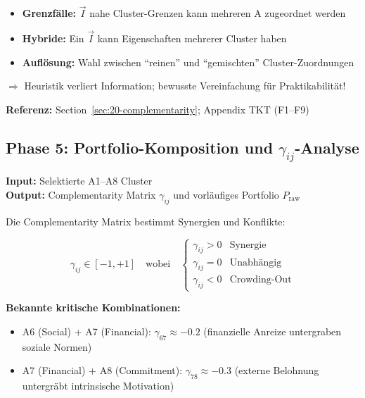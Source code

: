 \begin{tcolorbox}[colback=orange!5!white, colframe=orange!75!black,
    title=\textbf{Variabilität in Phase 4}]
\begin{itemize}[nosep]
\item \textbf{Grenzfälle:} $\vec{I}$ nahe Cluster-Grenzen kann mehreren A zugeordnet werden
\item \textbf{Hybride:} Ein $\vec{I}$ kann Eigenschaften mehrerer Cluster haben
\item \textbf{Auflösung:} Wahl zwischen ``reinen'' und ``gemischten'' Cluster-Zuordnungen
\end{itemize}
$\Rightarrow$ Heuristik verliert Information; bewusste Vereinfachung für Praktikabilität!
\end{tcolorbox}

\textbf{Referenz:} Section~\ref{sec:20-complementarity}; Appendix TKT (F1--F9)

\subsection{Phase 5: Portfolio-Komposition und $\gamma_{ij}$-Analyse}
\label{sec:20-phase5}

\textbf{Input:} Selektierte A1--A8 Cluster\\
\textbf{Output:} Complementarity Matrix $\gamma_{ij}$ und vorläufiges Portfolio $P_{\text{raw}}$

Die Complementarity Matrix bestimmt Synergien und Konflikte:

\begin{equation}
\gamma_{ij} \in [-1, +1] \quad \text{wobei} \quad
\begin{cases}
\gamma_{ij} > 0 & \text{Synergie} \\
\gamma_{ij} = 0 & \text{Unabhängig} \\
\gamma_{ij} < 0 & \text{Crowding-Out}
\end{cases}
\end{equation}

\textbf{Bekannte kritische Kombinationen:}
\begin{itemize}[nosep]
\item A6 (Social) + A7 (Financial): $\gamma_{67} \approx -0.2$ (finanzielle Anreize untergraben soziale Normen)
\item A7 (Financial) + A8 (Commitment): $\gamma_{78} \approx -0.3$ (externe Belohnung untergräbt intrinsische Motivation)
\end{itemize}

